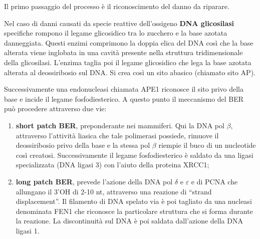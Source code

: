 \documentclass[11pt]{book}
\begin{document}
Il primo passaggio del processo è il riconoscimento del danno da
riparare.

Nel caso di danni causati da specie reattive dell'ossigeno \textbf{DNA
glicosilasi} specifiche rompono il legame glicosidico tra lo zucchero e
la base azotata danneggiata. Questi enzimi comprimono la doppia elica
del DNA così che la base alterata viene inglobata in una cavità presente
nella struttura tridimensionale della glicosilasi. L'enzima taglia poi
il legame glicosidico che lega la base azotata alterata al deossiribosio
sul DNA. Si crea così un sito abasico (chiamato sito AP).

Successivamente una endonucleasi chiamata APE1 riconosce il sito privo
della base e incide il legame fosfodiesterico. A questo punto il
meccanismo del BER può procedere attraverso due vie:

\begin{enumerate}
\def\labelenumi{\arabic{enumi}.}
\itemsep1pt\parskip0pt
\item
  \textbf{short patch BER}, preponderante nei mammiferi. Qui la DNA pol
  \(\beta\), attraverso l'attività liasica che tale polimerasi possiede,
  rimuove il deossiribosio privo della base e la stessa pol \(\beta\)
  riempie il buco di un nucleotide così creatosi. Successivamente il
  legame fosfodiesterico è saldato da una ligasi specializzata (DNA
  ligasi 3) con l'aiuto della proteina XRCC1;
\item
  \textbf{long patch BER}, prevede l'azione della DNA pol \(\delta\) e
  \(\varepsilon\) e di PCNA che allungano il 3'OH di 2-10 nt, attraverso
  una reazione di ``strand displacement''. Il filamento di DNA spelato
  via è poi tagliato da una nucleasi denominata FEN1 che riconosce la
  particolare struttura che si forma durante la reazione. La
  discontinuità sul DNA è poi saldata dall'azione della DNA ligasi 1.
\end{enumerate}

\clearpage
\end{document}

